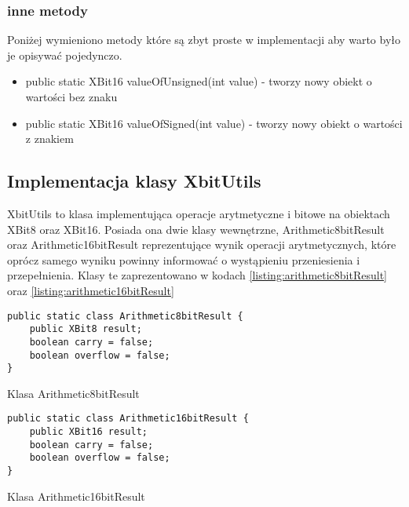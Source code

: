 	\subsubsection{inne metody}
	Poniżej wymieniono metody które są zbyt proste w implementacji aby warto było je opisywać pojedynczo. 
	\begin{itemize}  
		\item public static XBit16 valueOfUnsigned(int value) - tworzy nowy obiekt o wartości bez znaku
		\item public static XBit16 valueOfSigned(int value) - tworzy nowy obiekt o wartości z znakiem
	\end{itemize}


	\subsection{Implementacja klasy XbitUtils}
	XbitUtils to klasa implementująca operacje arytmetyczne i bitowe na obiektach XBit8 oraz XBit16. Posiada ona dwie klasy wewnętrzne, Arithmetic8bitResult oraz Arithmetic16bitResult reprezentujące wynik operacji arytmetycznych, które oprócz samego wyniku powinny informować o wystąpieniu przeniesienia i przepełnienia. Klasy te zaprezentowano w kodach \ref{listing:arithmetic8bitResult} oraz \ref{listing:arithmetic16bitResult}
	
	\begin{listing}[h]
		\begin{verbatim}
public static class Arithmetic8bitResult {
	public XBit8 result;
	boolean carry = false;
	boolean overflow = false;
}
		\end{verbatim}
		\caption{Klasa Arithmetic8bitResult}
		\label{listing:arithmetic8bitResult}
	\end{listing}

	\begin{listing}[h]
		\begin{verbatim}
public static class Arithmetic16bitResult {
	public XBit16 result;
	boolean carry = false;
	boolean overflow = false;
}
		\end{verbatim}
		\caption{Klasa Arithmetic16bitResult}
		\label{listing:arithmetic16bitResult}
	\end{listing}
	
